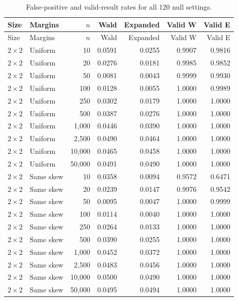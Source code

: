 \begin{longtable}{@{}llrrrrr@{}}
\caption{False-positive and valid-result rates for all 120 null settings.}\label{tab:all-main-null}\\
\toprule Size & Margins & \(n\) & Wald & Expanded & Valid W & Valid E\\\midrule\endfirsthead
\toprule Size & Margins & \(n\) & Wald & Expanded & Valid W & Valid E\\\midrule\endhead
\(2\times2\) & Uniform & 10 & 0.0591 & 0.0255 & 0.9907 & 0.9816\\
\(2\times2\) & Uniform & 20 & 0.0276 & 0.0181 & 0.9985 & 0.9852\\
\(2\times2\) & Uniform & 50 & 0.0081 & 0.0043 & 0.9999 & 0.9930\\
\(2\times2\) & Uniform & 100 & 0.0128 & 0.0055 & 1.0000 & 0.9989\\
\(2\times2\) & Uniform & 250 & 0.0302 & 0.0179 & 1.0000 & 1.0000\\
\(2\times2\) & Uniform & 500 & 0.0387 & 0.0276 & 1.0000 & 1.0000\\
\(2\times2\) & Uniform & 1,000 & 0.0446 & 0.0390 & 1.0000 & 1.0000\\
\(2\times2\) & Uniform & 2,500 & 0.0490 & 0.0464 & 1.0000 & 1.0000\\
\(2\times2\) & Uniform & 10,000 & 0.0465 & 0.0458 & 1.0000 & 1.0000\\
\(2\times2\) & Uniform & 50,000 & 0.0491 & 0.0490 & 1.0000 & 1.0000\\
\(2\times2\) & Same skew & 10 & 0.0358 & 0.0094 & 0.9572 & 0.6471\\
\(2\times2\) & Same skew & 20 & 0.0239 & 0.0147 & 0.9976 & 0.9542\\
\(2\times2\) & Same skew & 50 & 0.0095 & 0.0047 & 1.0000 & 0.9999\\
\(2\times2\) & Same skew & 100 & 0.0114 & 0.0040 & 1.0000 & 1.0000\\
\(2\times2\) & Same skew & 250 & 0.0264 & 0.0133 & 1.0000 & 1.0000\\
\(2\times2\) & Same skew & 500 & 0.0390 & 0.0255 & 1.0000 & 1.0000\\
\(2\times2\) & Same skew & 1,000 & 0.0452 & 0.0372 & 1.0000 & 1.0000\\
\(2\times2\) & Same skew & 2,500 & 0.0483 & 0.0456 & 1.0000 & 1.0000\\
\(2\times2\) & Same skew & 10,000 & 0.0500 & 0.0490 & 1.0000 & 1.0000\\
\(2\times2\) & Same skew & 50,000 & 0.0495 & 0.0494 & 1.0000 & 1.0000\\

\end{longtable}

